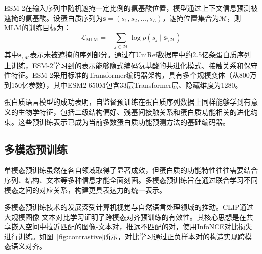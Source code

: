 ESM-2在输入序列中随机遮掩一定比例的氨基酸位置，模型通过上下文信息预测被遮掩的氨基酸。设蛋白质序列为$\mathbf{s} = (s_1, s_2, \ldots, s_L)$，遮掩位置集合为$\mathcal{M}$，则MLM的训练目标为：
\begin{equation}
\mathcal{L}_{\text{MLM}} = -\sum_{j \in \mathcal{M}} \log p(s_j \mid \mathbf{s}_{\setminus \mathcal{M}})
\end{equation}
其中$\mathbf{s}_{\setminus \mathcal{M}}$表示未被遮掩的序列部分。通过在UniRef数据库中约2.5亿条蛋白质序列上训练，ESM-2学习到的表示能够隐式编码氨基酸的共进化模式、接触关系和保守性特征。ESM-2采用标准的Transformer编码器架构，具有多个规模变体（从800万到150亿参数），其中ESM2-650M包含33层Transformer层、隐藏维度为1280。

蛋白质语言模型的成功表明，自监督预训练在蛋白质序列数据上同样能够学到有意义的生物学特征，包括二级结构偏好、残基间接触关系和蛋白质功能相关的进化约束。这些预训练表示已成为当前多数蛋白质功能预测方法的基础编码器。

\subsection{多模态预训练}

单模态预训练虽然在各自领域取得了显著成效，但蛋白质的功能特性往往需要结合序列、结构、文本等多种信息才能全面刻画。多模态预训练旨在通过联合学习不同模态之间的对应关系，构建更具表达力的统一表示。

多模态预训练技术的发展深受计算机视觉与自然语言处理领域的推动。CLIP\cite{radford2021learning}通过大规模图像-文本对比学习证明了跨模态对齐预训练的有效性。其核心思想是在共享嵌入空间中拉近匹配的图像-文本对，推远不匹配的对，使用InfoNCE对比损失进行训练。如图~\ref{fig:contrastive}所示，对比学习通过正负样本对的构造实现跨模态语义对齐。

